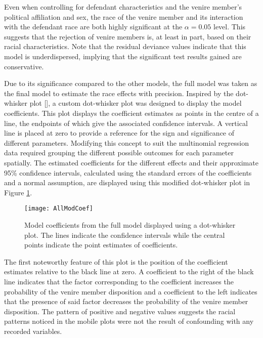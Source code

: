 Even when controlling for defendant characteristics and the venire member's political affiliation and sex, the race of the venire
member and its interaction with the defendant race are both highly significant at the $\alpha = 0.05$ level. This suggests that
the rejection of venire members is, at least in part, based on their racial characteristics. Note that the residual deviance values indicate that this model
is underdispersed, implying that the significant test results gained
are conservative.

Due to its significance compared to the other models, the full model was taken as the final model to estimate the race effects
with precision. Inspired by the dot-whisker plot [\cite{dotwhisker}], a custom dot-whisker plot was designed to display the model coefficients. This plot displays the coefficient estimates as points in the centre of a line, the endpoints of which
give the associated confidence intervals. A vertical line is placed at zero to provide a reference for the sign and significance
of different parameters. Modifying this concept to suit the multinomial regression data required grouping
the different possible outcomes for each parameter spatially. The estimated coefficients for the different effects and their approximate 95\% confidence intervals, calculated using the standard errors of the coefficients and a normal assumption, are displayed using this modified dot-whisker plot in Figure \ref{fig:modallcoef}.

\begin{figure}[h!]
  \centering
  \texttt{[image: AllModCoef]}
  \caption[All Model Coefficients]{\footnotesize Model coefficients from the full model displayed using
    a dot-whisker plot. The lines indicate the confidence intervals while the central points indicate the point estimates of
    coefficients.}
  \label{fig:modallcoef}
\end{figure}


The first noteworthy feature of this plot is the position of the
coefficient estimates relative to the black line at zero. A
coefficient to the right of the black line indicates that the factor
corresponding to the coefficient increases the probability of the
venire member disposition and a coefficient to the left indicates that the presence of said factor decreases the
probability of the venire member disposition. The pattern of positive and negative values suggests the racial patterns
noticed in the mobile plots were not the result of confounding with any recorded variables.

